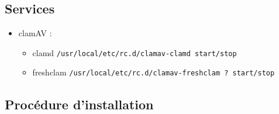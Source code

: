 \documentclass[10pt,a4paper]{article}
\begin{document}
\subsection{Services}
\begin{itemize}
    \item clamAV :
        \begin{itemize}
            \item clamd \texttt{/usr/local/etc/rc.d/clamav-clamd start/stop}
            \item freshclam \texttt{/usr/local/etc/rc.d/clamav-freshclam ? start/stop}
        \end{itemize}
\end{itemize}

\subsection{Procédure d'installation}
\end{document}
